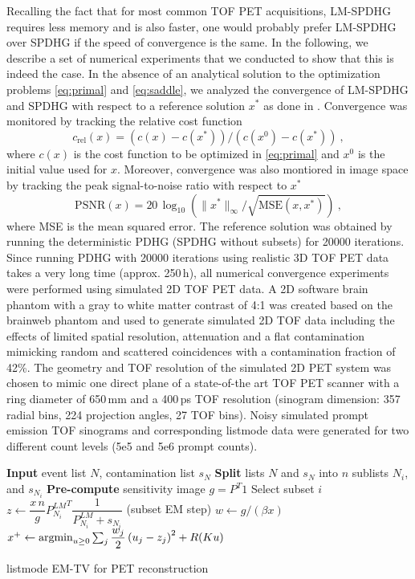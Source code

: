 Recalling the fact that for most common TOF PET acquisitions, LM-SPDHG requires less memory and 
is also faster, one would probably prefer LM-SPDHG over SPDHG if the speed of convergence is the same.
In the following, we describe a set of numerical experiments that we conducted to show that this
is indeed the case.
In the absence of an analytical solution to the optimization problems \eqref{eq:primal}
and \eqref{eq:saddle}, we analyzed the convergence of LM-SPDHG and SPDHG with respect to a 
reference solution $x^*$ as done in \cite{Ehrhardt2019}.
Convergence was monitored by tracking the relative cost function
\begin{equation}
c_\text{rel}(x) = (c(x) - c(x^*)) / (c(x^0) - c(x^*)) \ ,
\end{equation}
where $c(x)$ is the cost function to be optimized in \eqref{eq:primal} and $x^0$ is the initial value
used for $x$.
Moreover, convergence was also montiored in image space by tracking the peak signal-to-noise ratio
with respect to $x^*$
\begin{equation}
\text{PSNR}(x) = 20\,\log_{10} \left( \|x^*\|_\infty/\sqrt{\text{MSE}(x,x^*)} \right) \ ,
\end{equation}
where MSE is the mean squared error.
The reference solution was obtained by running the deterministic PDHG (SPDHG without subsets)
for 20000 iterations.
Since running PDHG with 20000 iterations using realistic 3D TOF PET data takes a very long 
time (approx. 250\,h), all numerical convergence experiments were performed using simulated 2D TOF PET data.
A 2D software brain phantom with a gray to white matter contrast of 4:1 was created
based on the brainweb phantom \cite{Collins1998} and used to generate simulated 2D TOF data 
including the effects of limited spatial resolution, attenuation and a flat contamination mimicking 
random and scattered coincidences with a contamination fraction of 42\%.
The geometry and TOF resolution of the simulated 2D PET system was chosen to 
mimic one direct plane of a state-of-the art TOF PET scanner with a ring diameter of 650\,mm
and a 400\,ps TOF resolution
(sinogram dimension: 357 radial bins, 224 projection angles, 27 TOF bins).
Noisy simulated prompt emission TOF sinograms and corresponding listmode data were generated
for two different count levels (5e5 and 5e6 prompt counts).

\begin{algorithm}[t]
\begin{algorithmic}[1]
\small
\State \textbf{Input} event list $N$, contamination list $s_N$
\State \textbf{Split} lists $N$ and $s_N$ into $n$ sublists $N_i$, and $s_{N_i}$
\State \textbf{Pre-compute} sensitivity image $g = P^T 1$
\Repeat
	\State Select subset $i$
	\State $z \gets \dfrac{x\,n}{g} {P_{N_i}^{LM}}^T \dfrac{1}{P_{N_i}^{LM} + s_{N_i}}$ (subset EM step)
  \State $w \gets g / (\beta x)$
  \State $x^+ \gets \operatorname*{argmin}_{u\geq 0} \sum_j \dfrac{w_j}{2} \left(u_j -z_j \right)^2 + R(Ku)$
\State {}
\end{algorithmic}
\caption{listmode EM-TV for PET reconstruction \cite{Sawatzky2008, Burger2008}}
\label{alg:emtv}
\end{algorithm}


